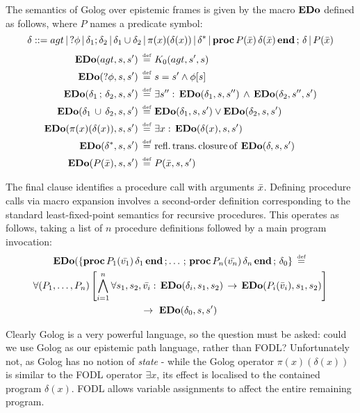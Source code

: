\begin{defnL}
 The semantics of Golog over epistemic
frames is given by the macro $\mathbf{EDo}$ defined as follows, where $P$
names a predicate symbol:\[
\delta::=agt\,|\,?\phi\,|\,\delta_{1};\delta_{2}\,|\,\delta_{1}\cup\delta_{2}\,|\,\pi(x)(\delta(x))\,|\,\delta^{*}\,|\,\mathbf{proc}\, P(\bar{x})\,\delta(\bar{x})\,\mathbf{end}\,;\,\delta\,|\, P(\bar{x})\]
\begin{align*}
\mathbf{EDo}(agt,s,s')\,\stackrel{\mbox{\tiny def}}{=}\,\, & K_{0}(agt,s',s)\\
\mathbf{EDo}(?\phi,s,s')\,\stackrel{\mbox{\tiny def}}{=}\,\, & s=s'\wedge\phi[s]\\
\mathbf{EDo}(\delta_{1}\,;\,\delta_{2},s,s')\,\stackrel{\mbox{\tiny def}}{=}\,\, & \exists s'':\,\mathbf{EDo}(\delta_{1},s,s'')\,\wedge\,\mathbf{EDo}(\delta_{2},s'',s')\\
\mathbf{EDo}(\delta_{1}\,\cup\,\delta_{2},s,s')\,\stackrel{\mbox{\tiny def}}{=}\,\, & \mathbf{EDo}(\delta_{1},s,s')\vee\mathbf{EDo}(\delta_{2},s,s')\\
\mathbf{EDo}(\pi(x)(\delta(x)),s,s')\,\stackrel{\mbox{\tiny def}}{=}\,\, & \exists x:\,\mathbf{EDo}(\delta(x),s,s')\\
\mathbf{EDo}(\delta^{*},s,s')\,\stackrel{\mbox{\tiny def}}{=}\,\, & \mathrm{refl.\, trans.\, closure\, of}\,\,\mathbf{EDo}(\delta,s,s')\\
\mathbf{EDo}(P(\bar{x}),s,s')\,\stackrel{\mbox{\tiny def}}{=}\,\, & P(\bar{x},s,s')\end{align*}

\end{defnL}
The final clause identifies a procedure call with arguments $\bar{x}$.
Defining procedure calls via macro expansion involves a second-order
definition corresponding to the standard least-fixed-point semantics
for recursive procedures. This operates as follows, taking a list
of $n$ procedure definitions followed by a main program invocation:\begin{multline*}
\mathbf{EDo}(\{\mathbf{proc}\, P_{1}(\bar{v_{1}})\,\delta_{1}\,\mathbf{end}\,;\dots\,;\,\mathbf{proc}\, P_{n}(\bar{v_{n}})\,\delta_{n}\,\mathbf{end}\,;\,\delta_{0}\}\,\stackrel{\mbox{\tiny def}}{=}\,\\
\forall(P_{1},\dots,P_{n})\left[\bigwedge_{i=1}^{n}\forall s_{1},s_{2},\bar{v_{i}}:\,\mathbf{EDo}(\delta_{i},s_{1},s_{2})\,\rightarrow\,\mathbf{EDo}(P_{i}(\bar{v}_{i}),s_{1},s_{2})\right]\\
\rightarrow\,\,\mathbf{EDo}(\delta_{0},s,s')\end{multline*}


Clearly Golog is a very powerful language, so the question must be
asked: could we use Golog as our epistemic path language, rather than
FODL? Unfortunately not, as Golog has no notion of \emph{state} -
while the Golog operator $\pi(x)(\delta(x))$ is similar to the FODL
operator $\exists x$, its effect is localised to the contained program
$\delta(x)$. FODL allows variable assignments to affect the entire
remaining program.

